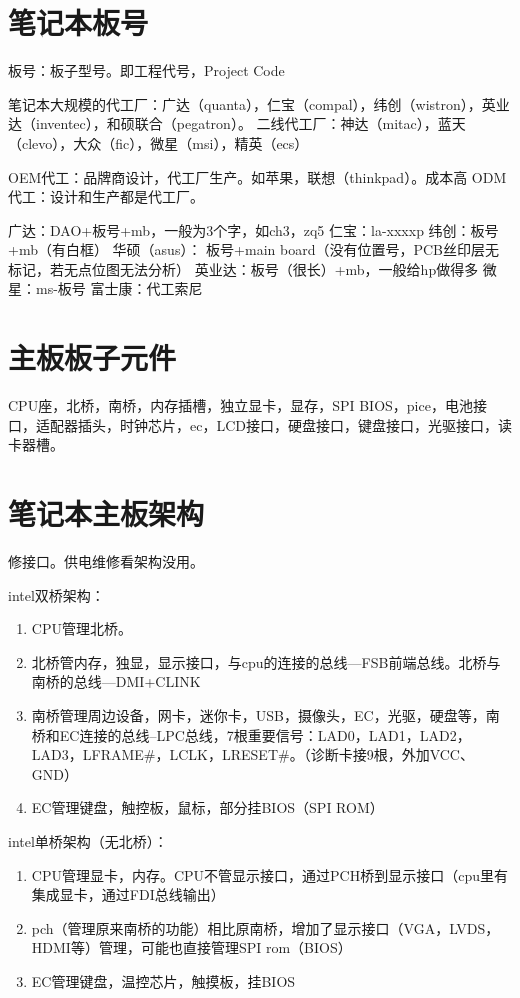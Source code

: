 \section{笔记本板号}
板号：板子型号。即工程代号，Project Code

笔记本大规模的代工厂：广达（quanta），仁宝（compal），纬创（wistron），英业达（inventec），和硕联合（pegatron）。
二线代工厂：神达（mitac），蓝天（clevo），大众（fic），微星（msi），精英（ecs）

OEM代工：品牌商设计，代工厂生产。如苹果，联想（thinkpad）。成本高
ODM代工：设计和生产都是代工厂。

广达：DAO+板号+mb，一般为3个字，如ch3，zq5
仁宝：la-xxxxp
纬创：板号+mb（有白框）
华硕（asus）： 板号+main board（没有位置号，PCB丝印层无标记，若无点位图无法分析）
英业达：板号（很长）+mb，一般给hp做得多
微星：ms-板号
富士康：代工索尼

\section{主板板子元件}
CPU座，北桥，南桥，内存插槽，独立显卡，显存，SPI BIOS，pice，电池接口，适配器插头，时钟芯片，ec，LCD接口，硬盘接口，键盘接口，光驱接口，读卡器槽。

\section{笔记本主板架构}
修接口。供电维修看架构没用。

intel双桥架构：
\begin{enumerate}
    \item CPU管理北桥。
    \item 北桥管内存，独显，显示接口，与cpu的连接的总线---FSB前端总线。北桥与南桥的总线---DMI+CLINK
    \item 南桥管理周边设备，网卡，迷你卡，USB，摄像头，EC，光驱，硬盘等，南桥和EC连接的总线--LPC总线，7根重要信号：LAD0，LAD1，LAD2，LAD3，LFRAME\#，LCLK，LRESET\#。（诊断卡接9根，外加VCC、GND）
    \item EC管理键盘，触控板，鼠标，部分挂BIOS（SPI ROM）
\end{enumerate}

intel单桥架构（无北桥）：
\begin{enumerate}
    \item CPU管理显卡，内存。CPU不管显示接口，通过PCH桥到显示接口（cpu里有集成显卡，通过FDI总线输出）
    \item pch（管理原来南桥的功能）相比原南桥，增加了显示接口（VGA，LVDS，HDMI等）管理，可能也直接管理SPI rom（BIOS）
    \item EC管理键盘，温控芯片，触摸板，挂BIOS
\end{enumerate}

